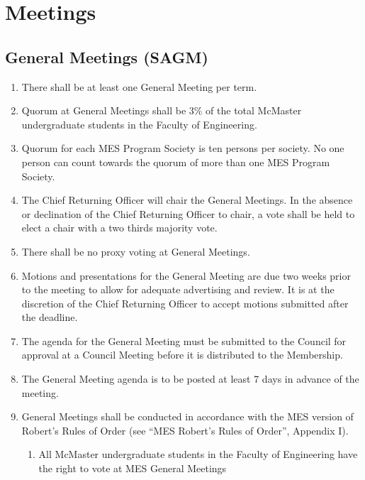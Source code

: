 \section{Meetings}
\label{meetings}

\subsection{General Meetings (SAGM)}
\label{general-meetings-sagm}
\begin{enumerate}
 \item
  There shall be at least one General Meeting per term.
 \item
  Quorum at General Meetings shall be 3\% of the total McMaster undergraduate students in the Faculty of Engineering.
 \item
  Quorum for each MES Program Society is ten persons per society. No one person can count towards the quorum of more than one MES Program Society.
 \item
  The Chief Returning Officer will chair the General Meetings. In the absence or declination of the Chief Returning Officer to chair, a vote shall be held to elect a chair with a two thirds majority vote.
 \item
  There shall be no proxy voting at General Meetings.
 \item
  Motions and presentations for the General Meeting are due two weeks prior to the meeting to allow for adequate advertising and review. It is at the discretion of the Chief Returning Officer to accept motions submitted after the deadline.
 \item
  The agenda for the General Meeting must be submitted to the Council for approval at a Council Meeting before it is distributed to the Membership.
 \item
  The General Meeting agenda is to be posted at least 7 days in advance of the meeting.
 \item
  General Meetings shall be conducted in accordance with the MES version of Robert's Rules of Order (see ``MES Robert's Rules of Order'', Appendix I).

  \begin{enumerate}
   \item
    All McMaster undergraduate students in the Faculty of Engineering have the right to vote at MES General Meetings
  \end{enumerate}


\end{enumerate}
